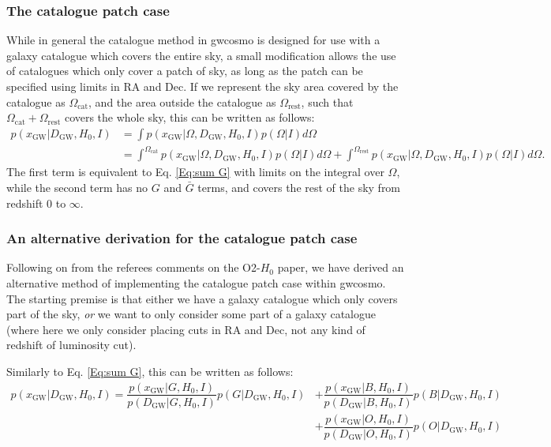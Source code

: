 \documentclass[a4paper,10pt]{article}
\begin{document}
\subsubsection{The catalogue patch case}
While in general the catalogue method in gwcosmo is designed for use with a galaxy catalogue which covers the entire sky, a small modification allows the use of catalogues which only cover a patch of sky, as long as the patch can be specified using limits in RA and Dec.  If we represent the sky area covered by the catalogue as $\Omega_{\text{cat}}$, and the area outside the catalogue as $\Omega_{\text{rest}}$, such that $\Omega_{\text{cat}}+\Omega_{\text{rest}}$ covers the whole sky, this can be written as follows:
\begin{equation}
\begin{aligned}
p(x_{\text{GW}}|D_{\text{GW}},H_0,I) &= \int p(x_{\text{GW}}|\Omega,D_{\text{GW}},H_0,I)p(\Omega|I) d\Omega
\\&=  \int^{\Omega_{\text{cat}}} p(x_{\text{GW}}|\Omega,D_{\text{GW}},H_0,I)p(\Omega|I) d\Omega + \int^{\Omega_{\text{rest}}}p(x_{\text{GW}}|\Omega,D_{\text{GW}},H_0,I)p(\Omega|I) d\Omega.
\end{aligned} 
\end{equation}
The first term is equivalent to Eq. \ref{Eq:sum G} with limits on the integral over $\Omega$, while the second term has no $G$ and $\bar{G}$ terms, and covers the rest of the sky from redshift 0 to $\infty$.

\subsubsection{An alternative derivation for the catalogue patch case}
Following on from the referees comments on the O2-$H_0$ paper, we have derived an alternative method of implementing the catalogue patch case within gwcosmo.  The starting premise is that either we have a galaxy catalogue which only covers part of the sky, \emph{or} we want to only consider some part of a galaxy catalogue (where here we only consider placing cuts in RA and Dec, not any kind of redshift of luminosity cut).

Similarly to Eq. \ref{Eq:sum G}, this can be written as follows:
\begin{equation} \label{Eq:sum G,B,O}
\begin{aligned}
p(x_{\text{GW}}|D_{\text{GW}},H_0,I) = \dfrac{p(x_{\text{GW}}|G,H_0,I)}{p(D_{\text{GW}}|G,H_0,I)} p(G|D_{\text{GW}},H_0,I) &+ \dfrac{p(x_{\text{GW}}|B,H_0,I)}{p(D_{\text{GW}}|B,H_0,I)} p(B|D_{\text{GW}},H_0,I) \\&+ \dfrac{p(x_{\text{GW}}|O,H_0,I)}{p(D_{\text{GW}}|O,H_0,I)} p(O|D_{\text{GW}},H_0,I)
\end{aligned} 
\end{equation}
\end{document}
